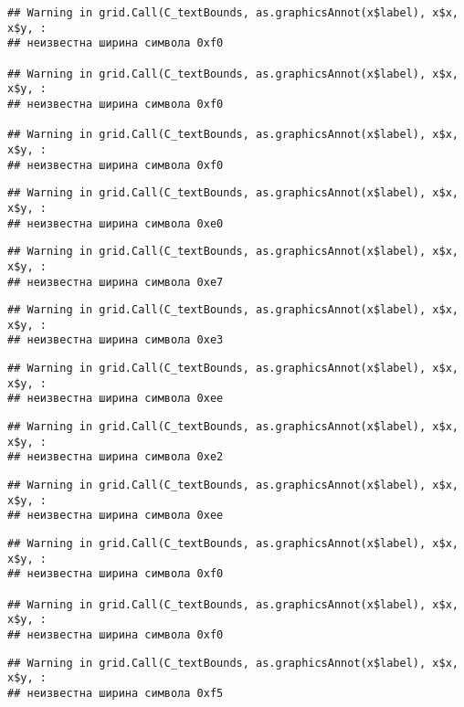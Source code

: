 \documentclass[
]{article}
\begin{document}
\begin{verbatim}
## Warning in grid.Call(C_textBounds, as.graphicsAnnot(x$label), x$x, x$y, :
## неизвестна ширина символа 0xf0

## Warning in grid.Call(C_textBounds, as.graphicsAnnot(x$label), x$x, x$y, :
## неизвестна ширина символа 0xf0

## Warning in grid.Call(C_textBounds, as.graphicsAnnot(x$label), x$x, x$y, :
## неизвестна ширина символа 0xf0
\end{verbatim}

\begin{verbatim}
## Warning in grid.Call(C_textBounds, as.graphicsAnnot(x$label), x$x, x$y, :
## неизвестна ширина символа 0xe0
\end{verbatim}

\begin{verbatim}
## Warning in grid.Call(C_textBounds, as.graphicsAnnot(x$label), x$x, x$y, :
## неизвестна ширина символа 0xe7
\end{verbatim}

\begin{verbatim}
## Warning in grid.Call(C_textBounds, as.graphicsAnnot(x$label), x$x, x$y, :
## неизвестна ширина символа 0xe3
\end{verbatim}

\begin{verbatim}
## Warning in grid.Call(C_textBounds, as.graphicsAnnot(x$label), x$x, x$y, :
## неизвестна ширина символа 0xee
\end{verbatim}

\begin{verbatim}
## Warning in grid.Call(C_textBounds, as.graphicsAnnot(x$label), x$x, x$y, :
## неизвестна ширина символа 0xe2
\end{verbatim}

\begin{verbatim}
## Warning in grid.Call(C_textBounds, as.graphicsAnnot(x$label), x$x, x$y, :
## неизвестна ширина символа 0xee
\end{verbatim}

\begin{verbatim}
## Warning in grid.Call(C_textBounds, as.graphicsAnnot(x$label), x$x, x$y, :
## неизвестна ширина символа 0xf0

## Warning in grid.Call(C_textBounds, as.graphicsAnnot(x$label), x$x, x$y, :
## неизвестна ширина символа 0xf0
\end{verbatim}

\begin{verbatim}
## Warning in grid.Call(C_textBounds, as.graphicsAnnot(x$label), x$x, x$y, :
## неизвестна ширина символа 0xf5
\end{verbatim}
\end{document}
